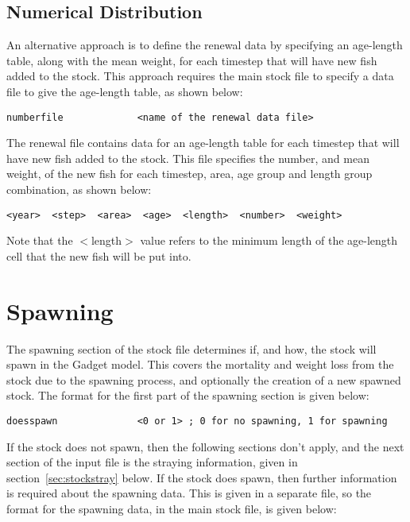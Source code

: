\documentclass[10pt,twoside]{book}
\begin{document}
\subsection{Numerical Distribution}
An alternative approach is to define the renewal data by specifying an age-length table, along with the mean weight, for each timestep that will have new fish added to the stock.  This approach requires the main stock file to specify a data file to give the age-length table, as shown below:

{\small\begin{verbatim}
numberfile             <name of the renewal data file>
\end{verbatim}}

The renewal file contains data for an age-length table for each timestep that will have new fish added to the stock.  This file specifies the number, and mean weight, of the new fish for each timestep, area, age group and length group combination, as shown below:

{\small\begin{verbatim}
<year>  <step>  <area>  <age>  <length>  <number>  <weight>
\end{verbatim}}

Note that the $<$length$>$ value refers to the minimum length of the age-length cell that the new fish will be put into.

\section{Spawning}\label{sec:stockspawn}
The spawning section of the stock file determines if, and how, the stock will spawn in the Gadget model.   This covers the mortality and weight loss from the stock due to the spawning process, and optionally the creation of a new spawned stock.  The format for the first part of the spawning section is given below:

{\small\begin{verbatim}
doesspawn              <0 or 1> ; 0 for no spawning, 1 for spawning
\end{verbatim}}

If the stock does not spawn, then the following sections don't apply, and the next section of the input file is the straying information, given in section~\ref{sec:stockstray} below.  If the stock does spawn, then further information is required about the spawning data.  This is given in a separate file, so the format for the spawning data, in the main stock file, is given below:
\end{document}

